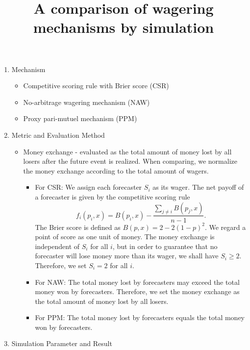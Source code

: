 \documentclass[english,10pt]{article}
\begin{document}
\title{A comparison of wagering mechanisms by simulation}
\maketitle

\begin{enumerate}
\item Mechanism
	\begin{itemize}
	\item Competitive scoring rule with Brier score (CSR)
	\item No-arbitrage wagering mechanism (NAW)
	\item Proxy pari-mutuel mechanism (PPM)
	\end{itemize}
\item Metric and Evaluation Method
	\begin{itemize}
	\item Money exchange - evaluated as the total amount of money lost by all losers after the future event is realized. When comparing, we normalize the money exchange according to the total amount of wagers.
		\begin{itemize}
		\item For CSR: 
			We assign each forecaster $S_i$ as its wager. The net payoff of a forecaster is given by 
			the competitive scoring rule
			$$f_i(p_i,x) = B(p_i,x) - \frac{\sum_{j\ne i}B(p_j,x)}{n-1}.$$
			The Brier score is defined as $B(p, x) = 2-2(1-p)^2$.
			We regard a point of score as one unit of money. The money exchange is independent of $S_i$ for all $i$, but in order to guarantee that no forecaster will lose money more than its wager, we shall have $S_i \ge 2$. Therefore, we set $S_i=2$ for all $i$.
		\item For NAW:  
			The total money lost by forecasters may exceed the total money won by forecasters. 
			Therefore, we set the money exchange as the total amount of money lost by all losers.
		\item For PPM:
		  	The total money lost by forecasters equals the total money won by forecasters. 
		\end{itemize}
	\end{itemize}
	\item Simulation Parameter and Result
	

\end{enumerate}
\end{document}

